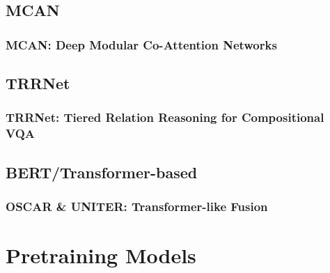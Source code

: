 \documentclass{beamer}
\begin{document}
\subsection{MCAN}

\begin{frame}
    \frametitle{MCAN: Deep Modular Co-Attention Networks}

    

\end{frame}

\subsection{TRRNet}

\begin{frame}
    \frametitle{TRRNet: Tiered Relation Reasoning for Compositional VQA}

    

\end{frame}

\subsection{BERT/Transformer-based}

\begin{frame}
    \frametitle{OSCAR \& UNITER: Transformer-like Fusion}

    

\end{frame}

\section{Pretraining Models}
\end{document}
